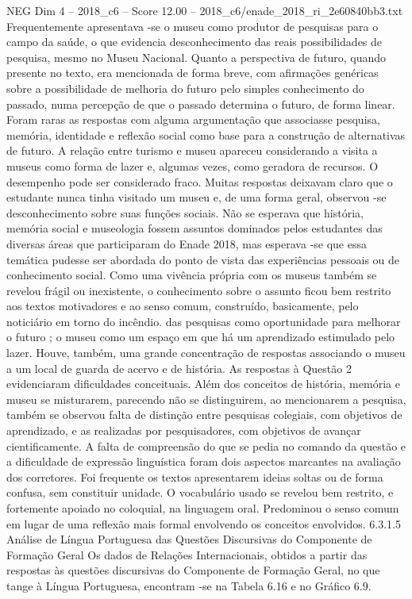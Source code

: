 \begin{textsample}{NEG Dim 4 – 2018\_c6 – Score 12.00 – 2018\_c6/enade\_2018\_ri\_2e60840bb3.txt}
Frequentemente apresentava -se o museu como produtor de pesquisas para o campo da saúde, o que evidencia desconhecimento das reais possibilidades de pesquisa, mesmo no Museu Nacional.
Quanto a perspectiva de futuro, quando presente no texto, era mencionada de forma breve, com afirmações genéricas sobre a possibilidade de melhoria do futuro pelo simples conhecimento do passado, numa percepção de que o passado determina o futuro, de forma linear.
Foram raras as respostas com alguma argumentação que associasse pesquisa, memória, identidade e reflexão social como base para a construção de alternativas de futuro.
A relação entre turismo e museu apareceu considerando a visita a museus como forma de lazer e, algumas vezes, como geradora de recursos.
O desempenho pode ser considerado fraco.
Muitas respostas deixavam claro que o estudante nunca tinha visitado um museu e, de uma forma geral, observou -se desconhecimento sobre suas funções sociais.
Não se esperava que história, memória social e museologia fossem assuntos dominados pelos estudantes das diversas áreas que participaram do Enade 2018, mas esperava -se que essa temática pudesse ser abordada do ponto de vista das experiências pessoais ou de conhecimento social.
Como uma vivência própria com os museus também se revelou frágil ou inexistente, o conhecimento sobre o assunto ficou bem restrito aos textos motivadores e ao senso comum, construído, basicamente, pelo noticiário em torno do incêndio. das pesquisas como oportunidade para melhorar o futuro ; o museu como um espaço em que há um aprendizado estimulado pelo lazer.
Houve, também, uma grande concentração de respostas associando o museu a um local de guarda de acervo e de história.
As respostas à Questão 2 evidenciaram dificuldades conceituais.
Além dos conceitos de história, memória e museu se misturarem, parecendo não se distinguirem, ao mencionarem a pesquisa, também se observou falta de distinção entre pesquisas colegiais, com objetivos de aprendizado, e as realizadas por pesquisadores, com objetivos de avançar cientificamente.
A falta de compreensão do que se pedia no comando da questão e a dificuldade de expressão linguística foram dois aspectos marcantes na avaliação dos corretores.
Foi frequente os textos apresentarem ideias soltas ou de forma confusa, sem constituir unidade.
O vocabulário usado se revelou bem restrito, e fortemente apoiado no coloquial, na linguagem oral.
Predominou o senso comum em lugar de uma reflexão mais formal envolvendo os conceitos envolvidos. 6.3.1.5 Análise de Língua Portuguesa das Questões Discursivas do Componente de Formação Geral Os dados de Relações Internacionais, obtidos a partir das respostas às questões discursivas do Componente de Formação Geral, no que tange à Língua Portuguesa, encontram -se na Tabela 6.16 e no Gráfico 6.9.

\end{textsample}
